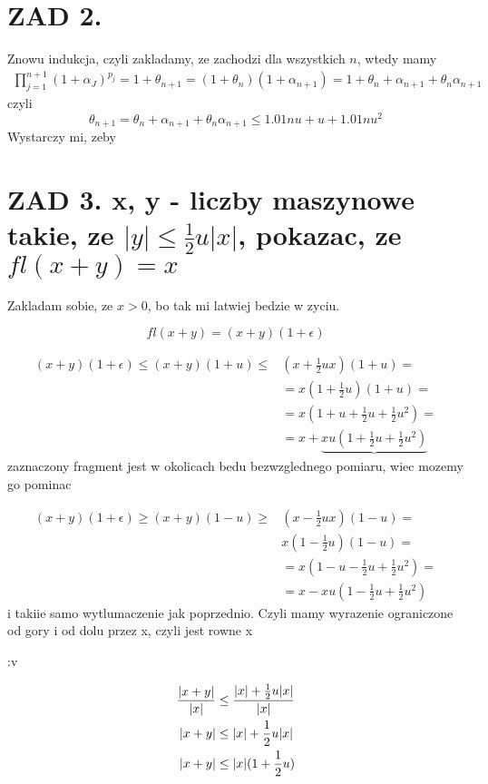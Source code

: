 \documentclass{article}[13pt]
\begin{document}
    \section*{ZAD 2.}

    Znowu indukcja, czyli zakladamy, ze zachodzi dla wszystkich $n$, wtedy mamy
    \begin{align*}
        \prod\limits_{j=1}^{n+1}(1+\alpha_J)^{p_j}=1+\theta_{n+1}=(1+\theta_n)(1+\alpha_{n+1})=1+\theta_n+\alpha_{n+1}+\theta_n\alpha_{n+1}
    \end{align*}
    czyli
    $$\theta_{n+1}=\theta_n+\alpha_{n+1}+\theta_n\alpha_{n+1}\leq1.01nu+u+1.01nu^2$$
    Wystarczy mi, zeby



    \section*{ZAD 3. x, y - liczby maszynowe takie, ze $|y|\leq \frac12 u|x|$, pokazac, ze $fl(x+y)=x$}

    Zakladam sobie, ze $x>0$, bo tak mi latwiej bedzie w zyciu.

    $$fl(x+y)=(x+y)(1+\epsilon)$$

    \begin{align*}
        (x+y)(1+\epsilon)\leq (x+y)(1+u)\leq &(x+\frac12ux)(1+u)=\\
        &=x(1+\frac12u)(1+u)=\\
        &=x(1+u+\frac12u+\frac12 u^2)=\\
        &=x+\underbrace{xu(1+\frac12u+\frac12u^2)}
    \end{align*}
    zaznaczony fragment jest w okolicach bedu bezwzglednego pomiaru, wiec mozemy go pominac

    \begin{align*}
        (x+y)(1+\epsilon)\geq (x+y)(1-u)\geq &(x-\frac12ux)(1-u)=\\
        &x(1-\frac12u)(1-u)=\\
        &=x(1-u-\frac12u+\frac12u^2)=\\
        &=x-xu(1-\frac12u+\frac12u^2)
    \end{align*}
    i takiie samo wytlumaczenie jak poprzednio. Czyli mamy wyrazenie ograniczone od gory i od dolu przez x, czyli jest rowne x 
    
    :v

    \begin{align*}
        {|x+y|\over|x|}&\leq{|x|+\frac12u|x|\over|x|}\\
        |x+y|&\leq|x|+\frac12u|x|\\
        |x+y|&\leq|x|(1+\frac12u)
    \end{align*}
\end{document}
